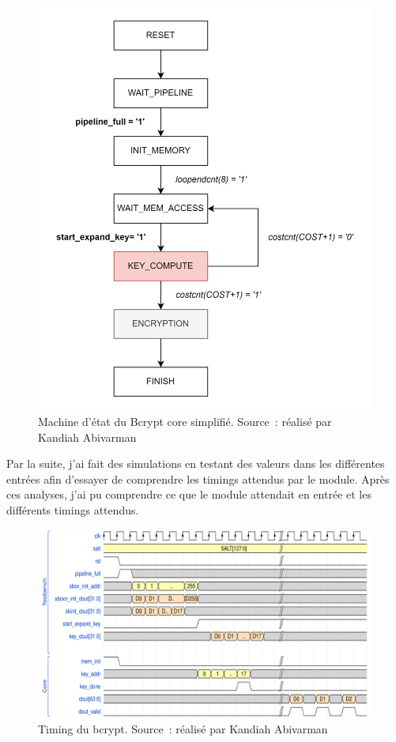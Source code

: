 \begin{figure}[tbph!]
	\centering
	\includegraphics[width=0.7\linewidth]{bcrypt_core_simplified_fsm}
	\caption[Machine d'état Bcrypt core simplifié]{Machine d'état du Bcrypt core simplifié. Source : réalisé par Kandiah Abivarman}
	\label{fig:bcrypt_core_simplified_fsm}
\end{figure}

Par la suite, j'ai fait des simulations en testant des valeurs dans les différentes entrées afin d'essayer de comprendre les timings attendus par le module. 
Après ces analyses, j'ai pu comprendre ce que le module attendait en entrée et les différents timings attendus.

\newpage

\begin{figure}[tbph!]
	\centering
	\includegraphics[width=0.9\linewidth]{bcrypt_tb_timing}
	\caption[Timing du bcrypt]{Timing du bcrypt. Source : réalisé par Kandiah Abivarman}
	\label{fig:bcrypt_tb_timing}
\end{figure}

